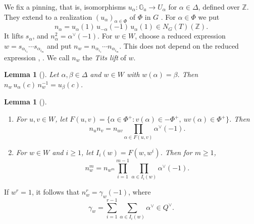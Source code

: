 \documentclass[psamsfonts]{amsart}
\newtheorem{lem}[thm]{Lemma}
\theoremstyle{definition}
\theoremstyle{remark}
\numberwithin{equation}{section}
\newcommand{\Z}{\mathbb{Z}}   %
\newcommand{\ra}{\rightarrow}
\newcommand\Ga{\mathbb{G}_a}
\numberwithin{equation}{section}
\theoremstyle{plain}
\begin{document}
We fix a pinning, that is, isomorphisms $u_\alpha\colon\Ga\ra U_\alpha$ for $\alpha\in\Delta$, defined over $\Z$. They extend to a realization $(u_\alpha)_{\alpha\in\Phi}$ of $\Phi$ in $G$ \cite[\S8.1]{Sp}. For $\alpha\in\Phi$ we put
\[
n_\alpha=u_\alpha(1)\,u_{-\alpha}(-1)\,u_\alpha(1)\in N_G(T)(\Z).
\]
It lifts $s_\alpha$, and $n_\alpha^2=\alpha^\vee(-1)$. For $w\in W$, choose a reduced expression $w=s_{\alpha_{i_1}}\cdots s_{\alpha_{i_m}}$ and put $n_w=n_{\alpha_{i_1}}\cdots n_{\alpha_{i_m}}$. This does not depend on the reduced expression \cite{Ti66}, \cite[\S9.3]{Sp}. We call $n_w$ the \emph{Tits lift} of $w$.

\begin{lem}[{\cite[Proposition~9.3.5]{Sp}}]\label{lem:springer}
Let $\alpha,\beta\in\Delta$ and $w\in W$ with $w(\alpha)=\beta$. Then $n_w\,u_\alpha(c)\,n_w^{-1}=u_\beta(c)$.
\end{lem}

\begin{lem}[{\cite[Proposition~2.2 and Corollary~2.4]{Ad}}]\label{lem:adrian}
\begin{enumerate}[(1)]
\item For $u,v\in W$, let $F(u,v)=\{\alpha\in\Phi^+: v(\alpha)\in-\Phi^+,\ uv(\alpha)\in\Phi^+\}$. Then
\[
n_u n_v=n_{uv}\prod_{\alpha\in F(u,v)}\alpha^\vee(-1).
\]
\item For $w\in W$ and $i\geq1$, let $I_i(w)=F(w,w^i)$. Then for $m\geq1$,
\[
n_w^m=n_{w^m}\prod_{i=1}^{m-1}\prod_{\alpha\in I_i(w)}\alpha^\vee(-1).
\]
\end{enumerate}
\end{lem}

If $w^r=1$, it follows that $n_w^r=\gamma_w(-1)$, where
\[
\gamma_w=\sum_{i=1}^{r-1}\sum_{\alpha\in I_i(w)}\alpha^\vee\in Q^\vee.
\]
\end{document}
